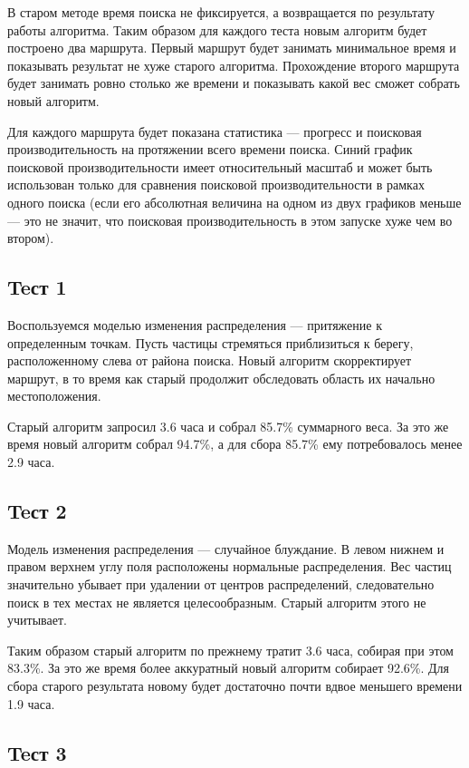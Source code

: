 В старом методе время поиска не фиксируется, а возвращается по результату работы алгоритма.
Таким образом для каждого теста новым алгоритм будет построено два маршрута. Первый маршрут будет
занимать минимальное время и показывать результат не хуже старого алгоритма. Прохождение второго
маршрута будет занимать ровно столько же времени и показывать какой вес сможет собрать новый
алгоритм.

Для каждого маршрута будет показана статистика --- прогресс и поисковая производительность
на протяжении всего времени поиска. Синий график поисковой производительности имеет
относительный масштаб и может быть использован только для сравнения поисковой производительности
в рамках одного поиска (если его абсолютная величина на одном из двух графиков меньше --- это
не значит, что поисковая производительность в этом запуске хуже чем во втором).
\subsection{Teст 1}

Воспользуемся моделью изменения распределения --- притяжение к определенным точкам. Пусть
частицы стремяться приблизиться к берегу, расположенному слева от района поиска. Новый алгоритм
скорректирует маршрут, в то время как старый продолжит обследовать область их начально
местоположения.

 Старый алгоритм запросил 3.6 часа и собрал 85.7\% суммарного веса.
За это же время новый алгоритм собрал 94.7\%, а для сбора 85.7\% ему потребовалось
менее 2.9 часа.

\subsection{Teст 2}
Модель изменения распределения --- случайное блуждание. В левом нижнем и правом верхнем
углу поля расположены нормальные распределения. Вес частиц значительно убывает при удалении
от центров распределений, следовательно поиск в тех местах не является целесообразным.
Старый алгоритм этого не учитывает.

Таким образом старый алгоритм по прежнему тратит 3.6 часа, собирая при этом 83.3\%.
За это же время более аккуратный новый алгоритм собирает 92.6\%. Для сбора старого
результата новому будет достаточно почти вдвое меньшего времени 1.9 часа.

\subsection{Teст 3}
